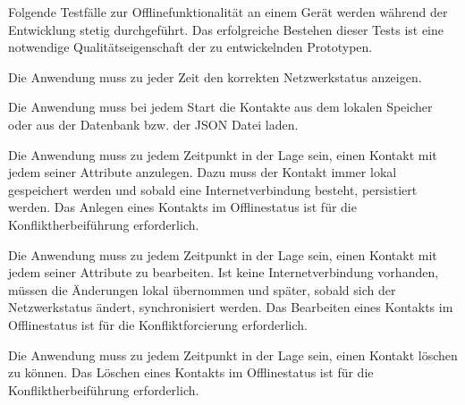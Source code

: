 Folgende Testfälle zur Offlinefunktionalität an einem Gerät werden während der Entwicklung stetig durchgeführt.
Das erfolgreiche Bestehen dieser Tests ist eine notwendige Qualitätseigenschaft der zu entwickelnden Prototypen.
\begin{description}[leftmargin=0.7cm,style=nextline]
\item[Netzwerkstatus:] 
Die Anwendung muss zu jeder Zeit den korrekten Netzwerkstatus anzeigen.\\
\item[Kontakte lesen:] 
Die Anwendung muss bei jedem Start die Kontakte aus dem lokalen Speicher oder aus der Datenbank bzw. der \gls{JSON} Datei laden.\\
\item[Kontakt anlegen:] 
Die Anwendung muss zu jedem Zeitpunkt in der Lage sein, einen Kontakt mit jedem seiner Attribute anzulegen.
Dazu muss der Kontakt immer lokal gespeichert werden und sobald eine Internetverbindung besteht, persistiert werden.
Das Anlegen eines Kontakts im Offlinestatus ist für die Konfliktherbeiführung erforderlich.\\
\item[Kontakt bearbeiten:] 
Die Anwendung muss zu jedem Zeitpunkt in der Lage sein, einen Kontakt mit jedem seiner Attribute zu bearbeiten.
Ist keine Internetverbindung vorhanden, müssen die Änderungen lokal übernommen und später, sobald sich der Netzwerkstatus ändert, synchronisiert werden.
Das Bearbeiten eines Kontakts im Offlinestatus ist für die Konfliktforcierung erforderlich.\\
\item[Kontakt löschen:] 
Die Anwendung muss zu jedem Zeitpunkt in der Lage sein, einen Kontakt löschen zu können.
Das Löschen eines Kontakts im Offlinestatus ist für die Konfliktherbeiführung erforderlich.
\end{description}